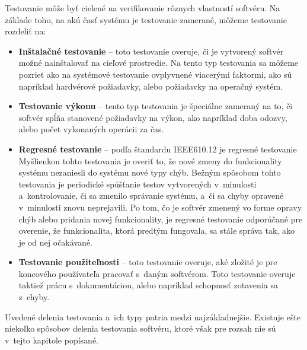\noindent Testovanie môže byť cielené na verifikovanie rôznych 
vlastností softvéru. Na základe toho, na akú časť systému je 
testovanie zamerané, môžeme testovanie rozdeliť na:
\begin{itemize}
\item \textbf{Inštalačné testovanie} --
toto testovanie overuje, či je vytvorený softvér možné nainštalovať
na cieľové prostredie. Na tento typ testovania sa môžeme pozrieť ako na 
systémové testovanie ovplyvnené viacerými faktormi, ako sú napríklad 
hardvérové požiadavky, alebo požiadavky na operačný systém. 

\item \textbf{Testovanie výkonu} --
tento typ testovania je špeciálne zameraný na to, či softvér spĺňa 
stanovené požiadavky na výkon, ako napríklad doba odozvy, alebo počet 
vykonaných operácii za čas. 

\item \textbf{Regresné testovanie} --
\label{sekcia:regresne_testovanie}
podľa štandardu IEEE610.12 \cite{Ieee_glossary} je regresné testovanie 
Myšlienkou tohto testovania je overiť to, že nové zmeny do funkcionality 
systému nezaniesli do systému nové typy chýb.
Bežným spôsobom tohto testovania je periodické spúšťanie testov 
vytvorených v~minulosti a~kontrolovanie, či sa zmenilo správanie
systému, a~či sa chyby opravené v~minulosti znovu neprejavili. Po tom, 
čo je softvér zmenený vo forme opravy chýb alebo pridania novej 
funkcionality, je regresné testovanie odporúčané pre overenie, že 
funkcionalita, ktorá predtým fungovala, sa stále správa tak, ako je od 
nej očakávané.

\item \textbf{Testovanie použiteľnosti} --
toto testovanie overuje, aké zložité je pre koncového 
používateľa pracovať s~daným softvérom. Toto testovanie overuje taktiež 
prácu s~dokumentáciou, alebo napríklad schopnosť zotavenia sa z~chyby. 
\end{itemize}

Uvedené delenia testovania a~ich typy patria medzi najzákladnejšie. 
Existuje ešte niekoľko spôsobov delenia testovania softvéru, ktoré však 
pre rozsah nie sú v~tejto kapitole popísané.



